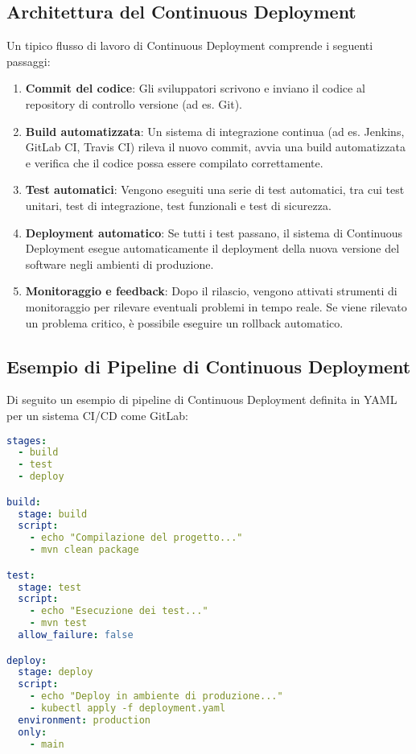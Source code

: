 \documentclass{article}
\begin{document}
\subsection{Architettura del Continuous Deployment}
Un tipico flusso di lavoro di Continuous Deployment comprende i seguenti passaggi:
\begin{enumerate}
    \item \textbf{Commit del codice}: Gli sviluppatori scrivono e inviano il codice al repository di controllo versione (ad es. Git).
    \item \textbf{Build automatizzata}: Un sistema di integrazione continua (ad es. Jenkins, GitLab CI, Travis CI) rileva il nuovo commit, avvia una build automatizzata e verifica che il codice possa essere compilato correttamente.
    \item \textbf{Test automatici}: Vengono eseguiti una serie di test automatici, tra cui test unitari, test di integrazione, test funzionali e test di sicurezza.
    \item \textbf{Deployment automatico}: Se tutti i test passano, il sistema di Continuous Deployment esegue automaticamente il deployment della nuova versione del software negli ambienti di produzione.
    \item \textbf{Monitoraggio e feedback}: Dopo il rilascio, vengono attivati strumenti di monitoraggio per rilevare eventuali problemi in tempo reale. Se viene rilevato un problema critico, è possibile eseguire un rollback automatico.
\end{enumerate}

\subsection{Esempio di Pipeline di Continuous Deployment}
Di seguito un esempio di pipeline di Continuous Deployment definita in YAML per un sistema CI/CD come GitLab:

\begin{lstlisting}[language=yaml, caption={Esempio di pipeline CI/CD in YAML}]
stages:
  - build
  - test
  - deploy

build:
  stage: build
  script:
    - echo "Compilazione del progetto..."
    - mvn clean package

test:
  stage: test
  script:
    - echo "Esecuzione dei test..."
    - mvn test
  allow_failure: false

deploy:
  stage: deploy
  script:
    - echo "Deploy in ambiente di produzione..."
    - kubectl apply -f deployment.yaml
  environment: production
  only:
    - main
\end{lstlisting}
\end{document}
